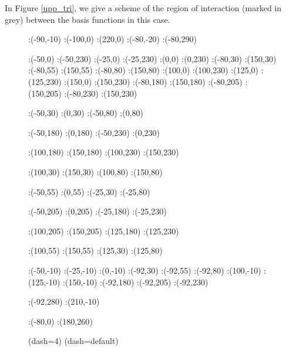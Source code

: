 In Figure \ref{upp_tri}, we give a scheme of the region of interaction (marked in grey) between the basis functions in this case. 
\begin{figure}[h]
\figinit{0.8pt}
:(-90,-10)
:(-100,0) :(220,0)
:(-80,-20) :(-80,290)

:(-50,0) :(-50,230)
:(-25,0) :(-25,230)
:(0,0) :(0,230)
%
:(-80,30) :(150,30)
:(-80,55) :(150,55)
:(-80,80) :(150,80)
%
:(100,0) :(100,230)
:(125,0) :(125,230)
:(150,0) :(150,230)
%
:(-80,180) :(150,180)
:(-80,205) :(150,205)
:(-80,230) :(150,230)

:(-50,30) :(0,30)
:(-50,80) :(0,80)

:(-50,180) :(0,180)
:(-50,230) :(0,230)

:(100,180) :(150,180)
:(100,230) :(150,230)

:(100,30) :(150,30)
:(100,80) :(150,80)

:(-50,55) :(0,55)
:(-25,30) :(-25,80)

:(-50,205) :(0,205)
:(-25,180) :(-25,230)

:(100,205) :(150,205)
:(125,180) :(125,230)

:(100,55) :(150,55)
:(125,30) :(125,80)

:(-50,-10) :(-25,-10) :(0,-10) 
:(-92,30) :(-92,55) :(-92,80) 
:(100,-10) :(125,-10) :(150,-10) 
:(-92,180) :(-92,205) :(-92,230) 

:(-92,280) :(210,-10)


:(-80,0) :(180,260)


\figdrawbegin{}
\figdrawarrow[1,2]
\figdrawarrow[3,4]
\figset(dash=4)
\figdrawline[5,6]
\figdrawline[7,8]
\figdrawline[9,10]
\figdrawline[11,12]
\figdrawline[13,14]
\figdrawline[15,16]
\figdrawline[17,18]
\figdrawline[19,20]
\figdrawline[21,22]
\figdrawline[23,24]
\figdrawline[25,26]
\figdrawline[27,28]
\figset(dash=default)


\end{figure}
